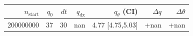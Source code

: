 \begin{tabular}{r r r r r r r}
\hline
$n_{\mathrm{start}}$ & $q_0$ & $dt$ & $q_{\mathrm{dx}}$ & $q_{\theta}$ (CI) & $\Delta q$ & $\Delta\theta$ \\
\hline
200000000 & 37 & 30 & nan & 4.77 [4.75,5.03] & +nan & +nan \\
\hline
\end{tabular}
